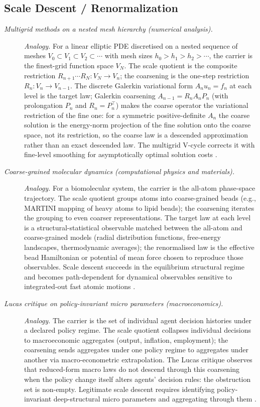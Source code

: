 \subsection*{ Scale Descent / Renormalization}
\begingroup\small
\begin{description}
\item[\emph{Multigrid methods on a nested mesh
hierarchy (numerical analysis).}] \textit{Analogy.}
For a linear elliptic PDE discretised on a nested
sequence of meshes
\(V_0\subset V_1\subset V_2\subset\cdots\) with mesh
sizes \(h_0>h_1>h_2>\cdots\), the carrier is the
finest-grid function space \(V_N\).  The scale quotient
is the composite restriction \(R_{n+1}\cdots R_N:V_N\to V_n\); the coarsening
is the one-step restriction \(R_n:V_n\to V_{n-1}\).  The discrete Galerkin variational
form \(A_n u_n=f_n\) at each level is the target law;
Galerkin coarsening \(A_{n-1}=R_n A_n P_n\) (with
prolongation \(P_n\) and \(R_n=P_n^{\!\top}\)) makes the coarse
operator the variational restriction of the fine one: for a symmetric
positive-definite \(A_n\) the coarse solution is the energy-norm
projection of the fine solution onto the coarse space, not its
restriction, so the coarse law is a descended approximation rather
than an exact descended law.  The multigrid V-cycle corrects it with
fine-level smoothing for asymptotically optimal solution costs \citep{Hackbusch1985Multigrid}.

\item[\emph{Coarse-grained molecular dynamics
(computational physics and materials).}] \textit{Analogy.}
For a biomolecular system, the carrier is the
all-atom phase-space trajectory.  The scale quotient
groups atoms into coarse-grained beads (e.g.,
MARTINI mapping of heavy atoms to lipid beads); the
coarsening iterates the grouping to even coarser
representations.  The target law at each level is a
structural-statistical observable matched between
the all-atom and coarse-grained models (radial
distribution functions, free-energy landscapes,
thermodynamic averages); the renormalised law is the
effective bead Hamiltonian or potential of mean force
chosen to reproduce those observables.  Scale descent
succeeds in the equilibrium structural regime and
becomes path-dependent for dynamical observables
sensitive to integrated-out fast atomic motions
\citep{Voth2008CoarseGraining}.

\item[\emph{Lucas critique on policy-invariant micro
parameters (macroeconomics).}] \textit{Analogy.}
The carrier is the set of individual agent decision
histories under a declared policy regime.  The scale
quotient collapses individual decisions to
macroeconomic aggregates (output, inflation,
employment); the coarsening sends aggregates under
one policy regime to aggregates under another via
macro-econometric extrapolation.  The Lucas critique
observes that reduced-form macro laws do not descend
through this coarsening when the policy change
itself alters agents' decision rules: the obstruction
set is non-empty.  Legitimate scale descent requires
identifying policy-invariant deep-structural micro
parameters and aggregating through them
\citep{Lucas1976Critique}.
\end{description}
\endgroup

